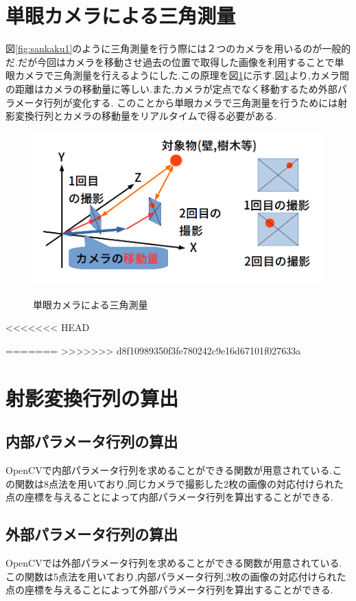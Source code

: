 \documentclass[12pt,oneside]{sotsuken_paper}
\begin{document}
\section{単眼カメラによる三角測量}
図\ref{fig:sankaku1}のように三角測量を行う際には２つのカメラを用いるのが一般的だ.だが今回はカメラを移動させ過去の位置で取得した画像を利用することで単眼カメラで三角測量を行えるようにした.この原理を図\ref{fig:sankaku2}に示す.図\ref{fig:sankaku2}より,カメラ間の距離はカメラの移動量に等しい.また,カメラが定点でなく移動するため外部パラメータ行列が変化する.
このことから単眼カメラで三角測量を行うためには射影変換行列とカメラの移動量をリアルタイムで得る必要がある.

\begin{figure}[htp]
 \begin{center}
  \includegraphics[width=120mm]{img/soft/sankaku2.png}
 　\caption{単眼カメラによる三角測量}
  \label{fig:sankaku2}%
 \end{center}
\end{figure}

<<<<<<< HEAD

=======
>>>>>>> d8f10989350f3fe780242c9e16d67101f027633a
\section{射影変換行列の算出}
\subsection{内部パラメータ行列の算出}
OpenCVで内部パラメータ行列を求めることができる関数が用意されている.この関数は8点法\cite{fivepoint}を用いており,同じカメラで撮影した2枚の画像の対応付けられた点の座標を与えることによって内部パラメータ行列を算出することができる.
\subsection{外部パラメータ行列の算出}
OpenCVでは外部パラメータ行列を求めることができる関数が用意されている.この関数は5点法\cite{fivepoint}を用いており,内部パラメータ行列,2枚の画像の対応付けられた点の座標を与えることによって外部パラメータ行列を算出することができる.
\end{document}
